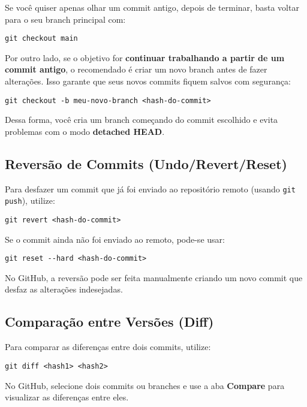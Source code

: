 Se você quiser apenas olhar um commit antigo, depois de terminar, basta voltar para o seu branch principal com:

\begin{lstlisting}[style=shellstyle]
git checkout main
\end{lstlisting}

Por outro lado, se o objetivo for \textbf{continuar trabalhando a partir de um commit antigo}, o recomendado é criar um novo branch antes de fazer alterações. Isso garante que seus novos commits fiquem salvos com segurança:

\begin{lstlisting}[style=shellstyle]
git checkout -b meu-novo-branch <hash-do-commit>
\end{lstlisting}

Dessa forma, você cria um branch começando do commit escolhido e evita problemas com o modo \textbf{detached HEAD}.  

\subsection{Reversão de Commits (Undo/Revert/Reset)}

Para desfazer um commit que já foi enviado ao repositório remoto (usando \texttt{git push}), utilize:

\begin{lstlisting}[style=shellstyle]
git revert <hash-do-commit>
\end{lstlisting}

Se o commit ainda não foi enviado ao remoto, pode-se usar:

\begin{lstlisting}[style=shellstyle]
git reset --hard <hash-do-commit>
\end{lstlisting}

No GitHub, a reversão pode ser feita manualmente criando um novo commit que desfaz as alterações indesejadas.

\subsection{Comparação entre Versões (Diff)}

Para comparar as diferenças entre dois commits, utilize:

\begin{lstlisting}[style=shellstyle]
git diff <hash1> <hash2>
\end{lstlisting}

No GitHub, selecione dois commits ou branches e use a aba \textbf{Compare} para visualizar as diferenças entre eles.

